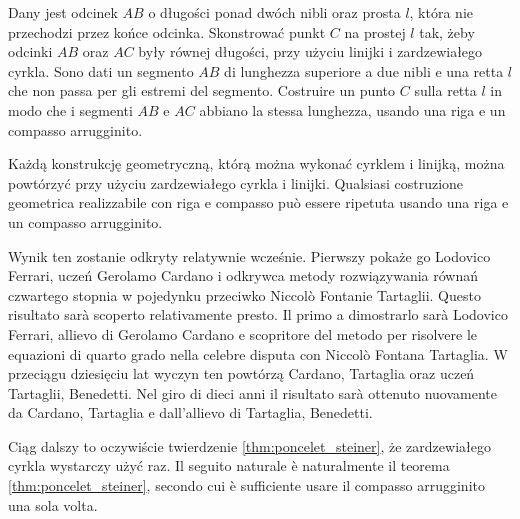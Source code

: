 \begin{geoconstruction}
    Dany jest odcinek $AB$ o długości ponad dwóch nibli oraz prosta $l$, która nie przechodzi przez końce odcinka. %
    Skonstrować punkt $C$ na prostej $l$ tak, żeby odcinki $AB$ oraz $AC$ były równej długości, przy użyciu linijki i zardzewiałego cyrkla. %
    Sono dati un segmento $AB$ di lunghezza superiore a due nibli e una retta $l$ che non passa per gli estremi del segmento. %
    Costruire un punto $C$ sulla retta $l$ in modo che i segmenti $AB$ e $AC$ abbiano la stessa lunghezza, usando una riga e un compasso arrugginito. %
\end{geoconstruction}

\begin{proposition}
\label{broken_ruler_compass_hartshorne_end}%
    Każdą konstrukcję geometryczną, którą można wykonać cyrklem i linijką, można powtórzyć przy użyciu zardzewiałego cyrkla i linijki. %
    Qualsiasi costruzione geometrica realizzabile con riga e compasso può essere ripetuta usando una riga e un compasso arrugginito. %
\end{proposition}

Wynik ten zostanie odkryty relatywnie wcześnie. %
Pierwszy pokaże go Lodovico Ferrari, uczeń Gerolamo Cardano i odkrywca metody rozwiązywania równań czwartego stopnia w pojedynku przeciwko Niccolò Fontanie Tartaglii. %
Questo risultato sarà scoperto relativamente presto. %
Il primo a dimostrarlo sarà Lodovico Ferrari, allievo di Gerolamo Cardano e scopritore del metodo per risolvere le equazioni di quarto grado nella celebre disputa con Niccolò Fontana Tartaglia. %
%
%
W przeciągu dziesięciu lat wyczyn ten powtórzą Cardano, Tartaglia oraz uczeń Tartaglii, Benedetti. %
Nel giro di dieci anni il risultato sarà ottenuto nuovamente da Cardano, Tartaglia e dall'allievo di Tartaglia, Benedetti. %
%
%

Ciąg dalszy to oczywiście twierdzenie \ref{thm:poncelet_steiner}, że zardzewiałego cyrkla wystarczy użyć raz. %
Il seguito naturale è naturalmente il teorema \ref{thm:poncelet_steiner}, secondo cui è sufficiente usare il compasso arrugginito una sola volta. %

%
